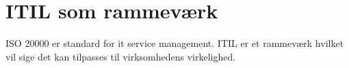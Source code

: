 \section{ITIL som rammeværk}
ISO 20000 er standard for it service management. ITIL er et rammeværk hvilket vil sige det kan tilpasses til virksomhedens virkelighed.





%
%


